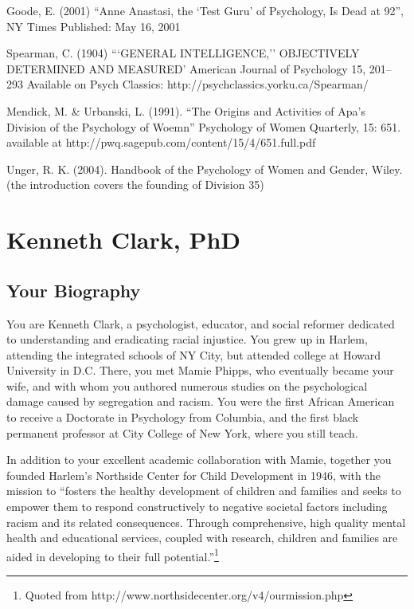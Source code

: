 Goode, E. (2001) ``Anne Anastasi, the `Test Guru' of Psychology, Is Dead at 92'', NY Times Published: May 16, 2001

Spearman, C. (1904) ```GENERAL INTELLIGENCE,'' OBJECTIVELY DETERMINED AND MEASURED' American Journal of Psychology 15, 201--293 Available on Psych Classics: http:\slash \slash psychclassics.yorku.ca\slash Spearman\slash 

Mendick, M. \& Urbanski, L. (1991). ``The Origins and Activities of Apa's Division of the Psychology of Woemn'' Psychology of Women Quarterly, 15: 651. available at http:\slash \slash pwq.sagepub.com\slash content\slash 15\slash 4\slash 651.full.pdf

Unger, R. K. (2004). Handbook of the Psychology of Women and Gender, Wiley. (the introduction covers the founding of Division 35)

\chapter{Kenneth Clark, PhD}
\label{kennethclarkphd}

\section{Your Biography}
\label{yourbiography}

You are Kenneth Clark, a psychologist, educator, and social reformer dedicated to understanding and eradicating racial injustice. You grew up in Harlem, attending the integrated schools of NY City, but attended college at Howard University in D.C. There, you met Mamie Phipps, who eventually became your wife, and with whom you authored numerous studies on the psychological damage caused by segregation and racism. You were the first African American to receive a Doctorate in Psychology from Columbia, and the first black permanent professor at City College of New York, where you still teach.

In addition to your excellent academic collaboration with Mamie, together you founded Harlem's Northside Center for Child Development in 1946, with the mission to ``fosters the healthy development of children and families and seeks to empower them to respond constructively to negative societal factors including racism and its related consequences. Through comprehensive, high quality mental health and educational services, coupled with research, children and families are aided in developing to their full potential.''\footnote{Quoted from http:\slash \slash www.northsidecenter.org\slash v4\slash ourmission.php}

